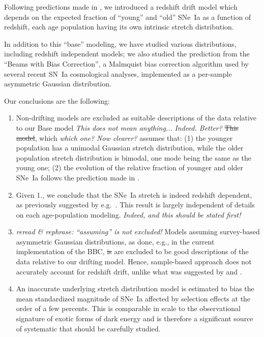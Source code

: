 \documentclass[]{aa} %
\newcommand{\nn}[1]{{\textcolor[rgb]{0.25, 0.50, 0}{#1}}}
\newcommand{\yc}[1]{{\textcolor{BrickRed}{#1}}}
\begin{document}
Following predictions made in \cite{rigault2018}, we introduced a redshift drift
model which depends on the expected fraction of ``young'' and ``old'' SNe~Ia as
a function of redshift, each age population having its own \yc{intrinsic}
stretch distribution.

In addition to this ``base'' modeling, we have studied various distributions,
including redshift independent models; we also studied the prediction from the
``Beams with Bias Correction'', a Malmquist bias correction algorithm used by
\nn{several} recent SN~Ia cosmological analyses, implemented as a per-sample
asymmetric Gaussian distribution.

Our conclusions are the following:
\begin{enumerate}

    \item Non-drifting models are excluded as \nn{suitable} descriptions of the
        data \nn{relative to} our Base model \yc{\textit{This does not mean
        anything...}} \nn{\textit{Indeed. Better?}} \nn{\sout{This model},
        which} \yc{\textit{which one?}} \nn{\textit{Now clearer?}} assumes
        that: (1) the younger population has a unimodal Gaussian stretch
        distribution, while the older population stretch distribution
        is bimodal, one mode being the same as the young one; (2) the
        evolution of the relative fraction of younger and older SNe~Ia
        follows the prediction made in \cite{rigault2018}. 

    \item Given 1., we conclude that the SNe~Ia stretch is indeed redshift
        dependent, as previously suggested by e.g.~\cite{howell2007}. This
        result is largely independent of details on each age-population
        modeling. \yc{\textit{Indeed, and this should be stated first!}}

    \item \yc{\textit{reread \& rephrase: ``assuming'' is not excluded!}}
        \nn{Models} assuming survey-based asymmetric Gaussian distributions, as
        done, e.g., in the current implementation of the BBC, \nn{\sout{is} are}
        excluded to be good descriptions of the data \nn{relative to} our
        drifting model. Hence, sample-based approach does not accurately
        account for redshift drift, unlike what was suggested by
        \cite{scolnic2016} and \cite{scolnic2018a}.

    \item An inaccurate underlying stretch distribution model is estimated to
        bias the mean standardized magnitude of SNe~Ia affected \nn{by}
        selection effects at the order of a few percents. This is
        comparable in scale to the observational signature of exotic forms of
        dark energy and is therefore a significant source of systematic that
        should be carefully studied.


\end{enumerate}
\end{document}
